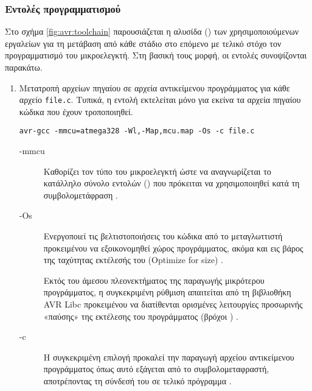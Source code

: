 \subsubsection{Εντολές προγραμματισμού}

Στο σχήμα \ref{fig:avr:toolchain} παρουσιάζεται η αλυσίδα () των
χρησιμοποιούμενων εργαλείων για τη μετάβαση από κάθε στάδιο στο επόμενο με
τελικό στόχο τον προγραμματισμό του μικροελεγκτή. Στη βασική τους μορφή, οι
εντολές συνοψίζονται παρακάτω.

\begin{enumerate}

    \item Μετατροπή αρχείων πηγαίου σε αρχεία αντικείμενου προγράμματος για κάθε
    αρχείο \verb~file.c~. Τυπικά, η εντολή εκτελείται μόνο για εκείνα τα αρχεία
    πηγαίου κώδικα που έχουν τροποποιηθεί.

\begin{lstlisting}
avr-gcc -mmcu=atmega328 -Wl,-Map,mcu.map -Os -c file.c
\end{lstlisting}

    \begin{description}
        \item[-mmcu] Καθορίζει τον τύπο του μικροελεγκτή ώστε να αναγνωρίζεται
        το κατάλληλο σύνολο εντολών () που πρόκειται να
        χρησιμοποιηθεί κατά τη συμβολομετάφραση \parencite{gcc:options}.

        \item[-Os] Ενεργοποιεί τις βελτιστοποιήσεις του κώδικα από το
        μεταγλωττιστή προκειμένου να εξοικονομηθεί χώρος προγράμματος, ακόμα και
        εις βάρος της ταχύτητας εκτέλεσής του (Optimize for size)
        \parencites[338]{avrlibc}{gcc:options}.

        Εκτός του άμεσου πλεονεκτήματος της παραγωγής μικρότερου προγράμματος, η
        συγκεκριμένη ρύθμιση απαιτείται από τη βιβλιοθήκη AVR Libc προκειμένου
        να διατίθενται ορισμένες λειτουργίες προσωρινής «παύσης» της εκτέλεσης
        του προγράμματος (βρόχοι ) \parencite[328]{avrlibc}.

        \item[-c] Η συγκεκριμένη επιλογή προκαλεί την παραγωγή αρχείου
        αντικείμενου προγράμματος όπως αυτό εξάγεται από το συμβολομεταφραστή,
        αποτρέποντας τη σύνδεσή του σε τελικό πρόγραμμα
        \parencites[338]{avrlibc}{gcc:options}.
    \end{description}



\end{enumerate}
